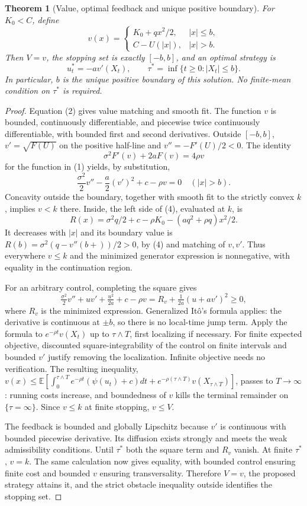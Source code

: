 \documentclass[11pt,a4paper]{article}
\newtheorem{theorem}{Theorem}[section]
\theoremstyle{definition}
\theoremstyle{remark}
\newcommand{\E}{\mathbb{E}}
\begin{document}
\begin{theorem}[Value, optimal feedback and unique positive boundary]
For $K_0<C$, define
\[
 v(x)=\begin{cases}K_0+qx^2/2,&|x|\leq b,\\
 C-U(|x|),&|x|>b.
 \end{cases}
\]
Then $V=v$, the stopping set is exactly $[-b,b]$, and an optimal strategy is
\[
 u_t^*=-a v'(X_t),\qquad
 \tau^*=\inf\{t\geq0:|X_t|\leq b\}.
\]
In particular, $b$ is the unique positive boundary of this solution. No finite-mean condition on $\tau^*$ is required.
\end{theorem}
\begin{proof}
Equation (2) gives value matching and smooth fit. The function $v$ is bounded, continuously differentiable, and piecewise twice continuously differentiable, with bounded first and second derivatives. Outside $[-b,b]$, $v'=\sqrt{F(U)}$ on the positive half-line and $v''=-F'(U)/2<0$. The identity
\[
 \sigma^2 F'(v)+2aF(v)=4\rho v
\]
for the function in (1) yields, by substitution,
\[
 \frac{\sigma^2}{2}v''-\frac a2(v')^2+c-\rho v=0\quad(|x|>b).\tag{4}
\]
Concavity outside the boundary, together with smooth fit to the strictly convex $k$, implies $v<k$ there. Inside, the left side of (4), evaluated at $k$, is
\[
 R(x)=\sigma^2q/2+c-\rho K_0-(a q^2+\rho q)x^2/2.
\]
It decreases with $|x|$ and its boundary value is
$R(b)=\sigma^2(q-v''(b+))/2>0$, by (4) and matching of $v,v'$. Thus everywhere $v\leq k$ and the minimized generator expression is nonnegative, with equality in the continuation region.

For an arbitrary control, completing the square gives
\[
 \tfrac{\sigma^2}2v''+u v'+\tfrac{u^2}{2a}+c-\rho v
 =R_v+\tfrac1{2a}(u+a v')^2\geq0,
\]
where $R_v$ is the minimized expression. Generalized It\^o's formula applies: the derivative is continuous at $\pm b$, so there is no local-time jump term. Apply the formula to $e^{-\rho t}v(X_t)$ up to $\tau\wedge T$, first localizing if necessary. For finite expected objective, discounted square-integrability of the control on finite intervals and bounded $v'$ justify removing the localization. Infinite objective needs no verification. The resulting inequality, $v(x)\leq\E[\int_0^{\tau\wedge T}e^{-\rho t}(\psi(u_t)+c)dt+e^{-\rho(\tau\wedge T)}v(X_{\tau\wedge T})]$, passes to $T\to\infty$: running costs increase, and boundedness of $v$ kills the terminal remainder on $\{\tau=\infty\}$. Since $v\leq k$ at finite stopping, $v\leq V$.

The feedback is bounded and globally Lipschitz because $v'$ is continuous with bounded piecewise derivative. Its diffusion exists strongly and meets the weak admissibility conditions. Until $\tau^*$ both the square term and $R_v$ vanish. At finite $\tau^*$, $v=k$. The same calculation now gives equality, with bounded control ensuring finite cost and bounded $v$ ensuring transversality. Therefore $V=v$, the proposed strategy attains it, and the strict obstacle inequality outside identifies the stopping set.
\end{proof}
\end{document}
